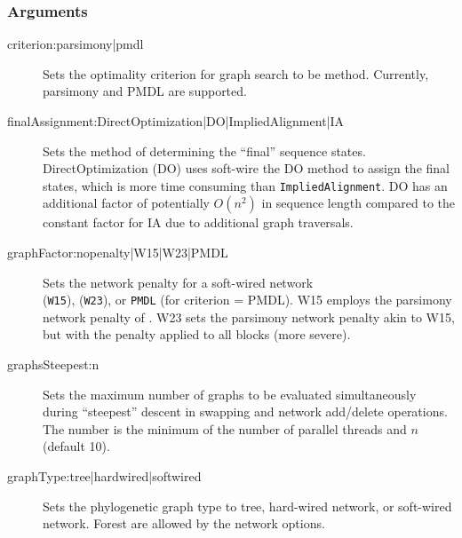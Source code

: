 	\subsubsection{Arguments}
		\begin{description}
			
			\item[criterion:parsimony|pmdl] Sets the optimality criterion for graph search to be 
			method. Currently, parsimony and PMDL \citep{WheelerandVaron2022} are supported.
			
			\item[finalAssignment:DirectOptimization|DO|ImpliedAlignment|IA] Sets the method 
			of determining the ``final'' sequence states. DirectOptimization (DO) uses soft-wire the DO 
			method to assign the final states, which is more time consuming than \texttt{ImpliedAlignment}. 
			DO has an additional factor of potentially $O(n^2)$ in sequence length compared 
			to the constant factor for IA due to additional graph traversals.
			
			\item[graphFactor:nopenalty|W15|W23|PMDL] Sets the network penalty for a soft-wired network\\ 
			(\texttt{W15}),  (\texttt{W23}), or \texttt{PMDL} (for criterion = PMDL). W15 employs the
			parsimony network penalty of \cite{Wheeler2015}. W23 sets the parsimony network penalty akin to
			W15, but with the penalty applied to all blocks (more severe).
			
			\item[graphsSteepest:n] Sets the maximum number of graphs to be evaluated 
			simultaneously during ``steepest'' descent in swapping and network add/delete operations. 
			The number is the minimum of the number of parallel threads and $n$ (default 10).
			
			\item[graphType:tree|hardwired|softwired] Sets the phylogenetic graph type to tree, 
			hard-wired network, or soft-wired network. Forest are allowed by the network options.
			

\end{description}
